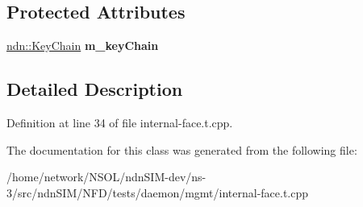 \subsection*{Protected Attributes}
\begin{DoxyCompactItemize}
\item 
\hyperlink{classndn_1_1security_1_1KeyChain}{ndn\+::\+Key\+Chain} {\bfseries m\+\_\+key\+Chain}\hypertarget{classnfd_1_1tests_1_1InternalFaceFixture_a78737534be534180e3cce059adab1812}{}\label{classnfd_1_1tests_1_1InternalFaceFixture_a78737534be534180e3cce059adab1812}

\end{DoxyCompactItemize}


\subsection{Detailed Description}


Definition at line 34 of file internal-\/face.\+t.\+cpp.



The documentation for this class was generated from the following file\+:\begin{DoxyCompactItemize}
\item 
/home/network/\+N\+S\+O\+L/ndn\+S\+I\+M-\/dev/ns-\/3/src/ndn\+S\+I\+M/\+N\+F\+D/tests/daemon/mgmt/internal-\/face.\+t.\+cpp\end{DoxyCompactItemize}
